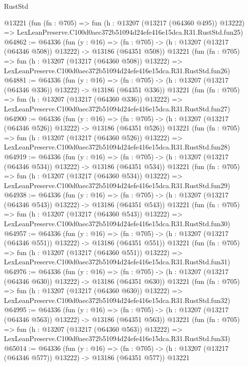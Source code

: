 \begin{lexlean}{RustStd}
\begin{coremodule}
    @13221
    (fun (fn : @705) =>
    fun (h : @13207 (@13217 (@64360 @495)) @13222) =>
    LexLeanPreserve.C100d0aec372b51094d24efe416e15dca.R31.RustStd.fun25)
@64862 := @64336
    (fun (y : @16) =>
    (fn : @705) -> (h : @13207 (@13217 (@64346 @508)) @13222) -> @13186 (@64351 @508))
    @13221
    (fun (fn : @705) =>
    fun (h : @13207 (@13217 (@64360 @508)) @13222) =>
    LexLeanPreserve.C100d0aec372b51094d24efe416e15dca.R31.RustStd.fun26)
@64881 := @64336
    (fun (y : @16) =>
    (fn : @705) -> (h : @13207 (@13217 (@64346 @336)) @13222) -> @13186 (@64351 @336))
    @13221
    (fun (fn : @705) =>
    fun (h : @13207 (@13217 (@64360 @336)) @13222) =>
    LexLeanPreserve.C100d0aec372b51094d24efe416e15dca.R31.RustStd.fun27)
@64900 := @64336
    (fun (y : @16) =>
    (fn : @705) -> (h : @13207 (@13217 (@64346 @526)) @13222) -> @13186 (@64351 @526))
    @13221
    (fun (fn : @705) =>
    fun (h : @13207 (@13217 (@64360 @526)) @13222) =>
    LexLeanPreserve.C100d0aec372b51094d24efe416e15dca.R31.RustStd.fun28)
@64919 := @64336
    (fun (y : @16) =>
    (fn : @705) -> (h : @13207 (@13217 (@64346 @534)) @13222) -> @13186 (@64351 @534))
    @13221
    (fun (fn : @705) =>
    fun (h : @13207 (@13217 (@64360 @534)) @13222) =>
    LexLeanPreserve.C100d0aec372b51094d24efe416e15dca.R31.RustStd.fun29)
@64938 := @64336
    (fun (y : @16) =>
    (fn : @705) -> (h : @13207 (@13217 (@64346 @543)) @13222) -> @13186 (@64351 @543))
    @13221
    (fun (fn : @705) =>
    fun (h : @13207 (@13217 (@64360 @543)) @13222) =>
    LexLeanPreserve.C100d0aec372b51094d24efe416e15dca.R31.RustStd.fun30)
@64957 := @64336
    (fun (y : @16) =>
    (fn : @705) -> (h : @13207 (@13217 (@64346 @551)) @13222) -> @13186 (@64351 @551))
    @13221
    (fun (fn : @705) =>
    fun (h : @13207 (@13217 (@64360 @551)) @13222) =>
    LexLeanPreserve.C100d0aec372b51094d24efe416e15dca.R31.RustStd.fun31)
@64976 := @64336
    (fun (y : @16) =>
    (fn : @705) -> (h : @13207 (@13217 (@64346 @630)) @13222) -> @13186 (@64351 @630))
    @13221
    (fun (fn : @705) =>
    fun (h : @13207 (@13217 (@64360 @630)) @13222) =>
    LexLeanPreserve.C100d0aec372b51094d24efe416e15dca.R31.RustStd.fun32)
@64995 := @64336
    (fun (y : @16) =>
    (fn : @705) -> (h : @13207 (@13217 (@64346 @563)) @13222) -> @13186 (@64351 @563))
    @13221
    (fun (fn : @705) =>
    fun (h : @13207 (@13217 (@64360 @563)) @13222) =>
    LexLeanPreserve.C100d0aec372b51094d24efe416e15dca.R31.RustStd.fun33)
@65014 := @64336
    (fun (y : @16) =>
    (fn : @705) -> (h : @13207 (@13217 (@64346 @577)) @13222) -> @13186 (@64351 @577))
    @13221

\end{coremodule}
\end{lexlean}

